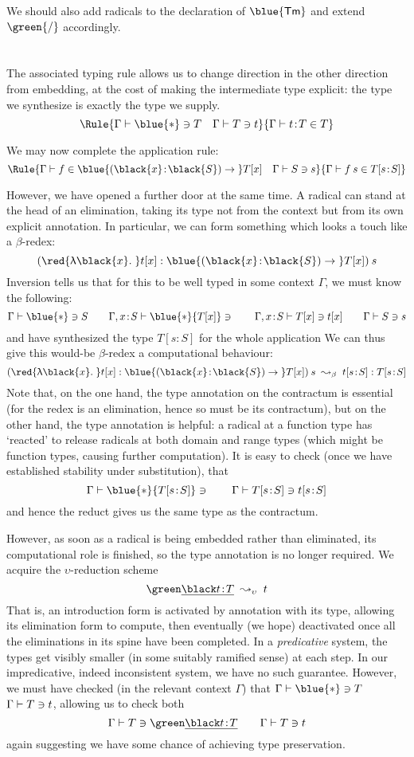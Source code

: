 \documentclass[natbib]{article}
\newcommand{\type}{\blue{\ast}}
\newcommand{\hb}{\!:\!}
\newcommand{\PI}[2]{\blue{(\black{#1}\hb \black{#2})\to\;}}
\newcommand{\LA}[1]{\red{\uplambda\black{#1}.\;}}
\newcommand{\D}[1]{\blue{\mathsf{#1}}}
\newcommand{\F}[1]{\green{\mathsf{#1}}}
\begin{document}
We should also add radicals to the declaration of \ensuremath{\D{Tm}} and extend \ensuremath{\F{\slash}} accordingly.\\
\usebox{\radbox}\vspace*{ -0.2in}\\
\usebox{\radactbox}\\

The associated typing rule allows us to change direction in the other direction from embedding, at the cost of making the intermediate type explicit: the type we synthesize is exactly the type we supply.
\[\Rule{\CHK\Gamma\type T\quad \CHK\Gamma Tt}
       {\SYN\Gamma{t\hb T}T}
\]

We may now complete the application rule:
\[
\Rule{\SYN\Gamma f {\PI xS T[x]} \quad \CHK\Gamma Ss}
     {\SYN\Gamma{f\:s}{T[s\hb S]}}
\]

However, we have opened a further door at the same time. A radical can stand at the head of an elimination, taking its type not from the context but from its own explicit annotation. In particular, we can form something which looks a touch like a $\beta$-redex:
\[
(\LA xt[x] : \PI xS T[x])\:s
\]
Inversion tells us that for this to be well typed in some context $\Gamma$, we must know the following:
\[
\CHK\Gamma\type S \qquad
\CHK{\Gamma,x\hb S}\type{T[x]} \qquad
\CHK{\Gamma,x\hb S}{T[x]}{t[x]} \qquad
\CHK\Gamma Ss
\]
and have synthesized the type $T[s\hb S]$ for the whole application
We can thus give this would-be $\beta$-redex a computational behaviour:
\[
(\LA xt[x] : \PI xS T[x])\:s \;\leadsto_\beta\; t[s\hb S]:T[s\hb S]
\]
Note that, on the one hand, the type annotation on the contractum is essential (for the redex is an elimination, hence so must be its contractum), but on the other hand, the type annotation is helpful: a radical at a function type has `reacted' to release radicals at both domain and range types (which might be function types, causing further computation). It is easy to check (once we have established stability under substitution), that
\[
\CHK\Gamma\type{T[s\hb S]} \qquad
\CHK\Gamma{T[s\hb S]}{t[s\hb S]}
\]
and hence the reduct gives us the same type as the contractum.

However, as soon as a radical is being embedded rather than eliminated, its computational role is finished, so the type annotation is no longer required. We acquire the $\upsilon$-reduction scheme
\[
\el{t\hb T} \;\leadsto_\upsilon\; t
\]
That is, an introduction form is activated by annotation with its type, allowing its elimination form to compute, then eventually (we hope) deactivated once all the eliminations in its spine have been completed. In a \emph{predicative} system, the types get visibly smaller (in some suitably ramified sense) at each step. In our impredicative, indeed inconsistent system, we have no such guarantee. However, we must have checked (in the relevant context $\Gamma$) that $\CHK\Gamma\type T$ $\Gamma \vdash T \ni t$, allowing us to check both
\[
\CHK\Gamma T{\el{t\hb T}} \qquad \CHK\Gamma Tt
\]
again suggesting we have some chance of achieving type preservation.
\end{document}
